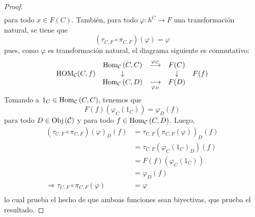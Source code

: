 \documentclass[12pt]{report}
\newcounter{it}
\theoremstyle{largebreak}
\newcommand\cf[3]{\ensuremath{#1:#2\rightarrow#3}}
\newcommand{\Obj}[1]{\ensuremath{\textup{Obj}\left(#1\right)}}
\newcommand{\Hom}[3]{\ensuremath{\textup{Hom}_{#1}\left(#2,#3\right)}}
\begin{document}
\begin{proof}
\begin{equation*}
\begin{split}
            \end{split}
        \end{equation*}
        para todo $x\in F(C)$. También, para todo $\cf{\varphi}{h^C}{F}$ una transformación natural, se tiene que
        \begin{equation*}
            (\tau_{ C,F}\circ\pi_{ C,F})(\varphi)=\varphi
        \end{equation*}
        pues, como $\varphi$ es transformación natural, el diagrama siguiente es conmutativo:
        \begin{equation*}
            \begin{array}[pos]{rcccl}
                & \Hom{\mathcal{C}}{C}{C} & \overset{\varphi_C}{\longrightarrow} & F(C) & \\
                \HOM{\mathcal{C}}(C,f) & \downarrow & & \downarrow & F(f) \\
               & \Hom{\mathcal{C}}{C}{D} & \underset{\varphi_{D}}{\longrightarrow} & F(D) & \\
            \end{array}
        \end{equation*}
        Tomando a $1_C\in\Hom{\mathcal{C}}{C}{C}$, tenemos que
        \begin{equation*}
            F(f)(\varphi_C(1_C))=\varphi_D(f)
        \end{equation*}
        para todo $D\in\Obj{\mathcal{C}}$ y para todo $f\in\Hom{\mathcal{C}}{C}{D}$. Luego,
        \begin{equation*}
            \begin{split}
                (\tau_{ C,F}\circ\pi_{ C,F})(\varphi)_D(f)&=\tau_{ C,F}(\pi_{ C,F}(\varphi))_D(f)\\
                &=\tau_{ C,F}(\varphi_C(1_C)_D)(f)\\
                &=F(f)(\varphi_C(1_C))\\
                &=\varphi_D(f)\\
                \Rightarrow \tau_{ C,F}\circ\pi_{ C,F}(\varphi)&=\varphi\\
            \end{split}
        \end{equation*}
        lo cual prueba el hecho de que amboas funciones sean biyectivas, que prueba el resultado.
    \end{proof}
\end{document}
